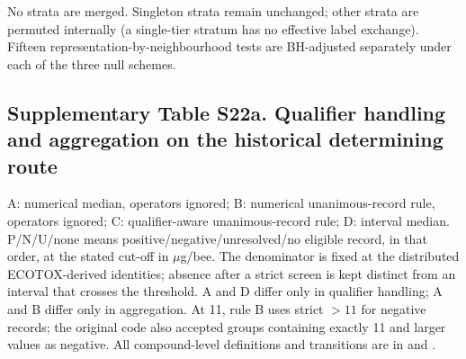 No strata are merged. Singleton strata remain unchanged; other strata are permuted internally (a single-tier stratum has no effective label exchange). Fifteen representation-by-neighbourhood tests are BH-adjusted separately under each of the three null schemes.

\subsection*{Supplementary Table S22a. Qualifier handling and aggregation on the historical determining route}

A: numerical median, operators ignored; B: numerical unanimous-record rule, operators ignored; C: qualifier-aware unanimous-record rule; D: interval median. P/N/U/none means positive/negative/unresolved/no eligible record, in that order, at the stated cut-off in $\mu$g/bee. The denominator is fixed at the distributed ECOTOX-derived identities; absence after a strict screen is kept distinct from an interval that crosses the threshold. A and D differ only in qualifier handling; A and B differ only in aggregation. At 11, rule B uses strict $>11$ for negative records; the original code also accepted groups containing exactly 11 and larger values as negative. All compound-level definitions and transitions are in  and .

\begingroup\small\setlength{\tabcolsep}{4pt}

